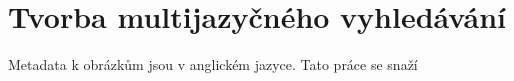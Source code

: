 \chapter{Tvorba multijazyčného vyhledávání}

Metadata k obrázkům jsou v anglickém jazyce. Tato práce se snaží 